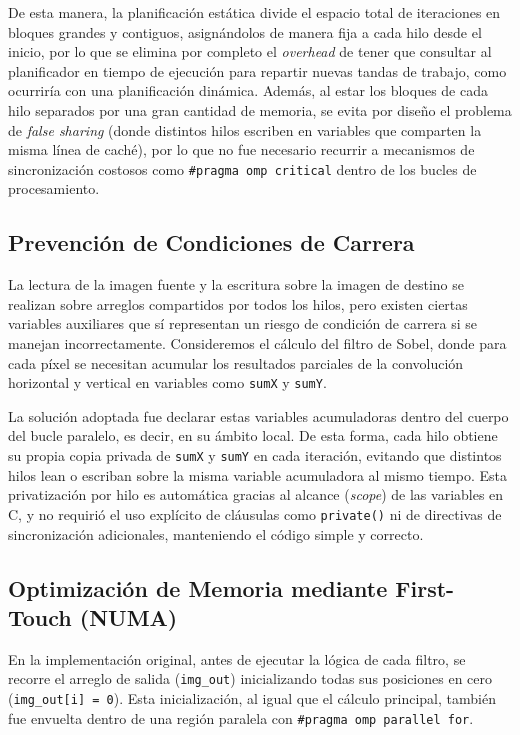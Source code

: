 De esta manera, la planificación estática divide el espacio total de iteraciones en bloques grandes y contiguos, asignándolos de manera fija a cada hilo desde el inicio, por lo que se elimina por completo el \textit{overhead} de tener que consultar al planificador en tiempo de ejecución para repartir nuevas tandas de trabajo, como ocurriría con una planificación dinámica. Además, al estar los bloques de cada hilo separados por una gran cantidad de memoria, se evita por diseño el problema de \textit{false sharing} (donde distintos hilos escriben en variables que comparten la misma línea de caché), por lo que no fue necesario recurrir a mecanismos de sincronización costosos como \texttt{\#pragma omp critical} dentro de los bucles de procesamiento.


\subsection{Prevención de Condiciones de Carrera}

La lectura de la imagen fuente y la escritura sobre la imagen de destino se realizan sobre arreglos compartidos por todos los hilos, pero existen ciertas variables auxiliares que sí representan un riesgo de condición de carrera si se manejan incorrectamente. Consideremos el cálculo del filtro de Sobel, donde para cada píxel se necesitan acumular los resultados parciales de la convolución horizontal y vertical en variables como \texttt{sumX} y \texttt{sumY}.

La solución adoptada fue declarar estas variables acumuladoras dentro del cuerpo del bucle paralelo, es decir, en su ámbito local. De esta forma, cada hilo obtiene su propia copia privada de \texttt{sumX} y \texttt{sumY} en cada iteración, evitando que distintos hilos lean o escriban sobre la misma variable acumuladora al mismo tiempo. Esta privatización por hilo es automática gracias al alcance (\textit{scope}) de las variables en C, y no requirió el uso explícito de cláusulas como \texttt{private()} ni de directivas de sincronización adicionales, manteniendo el código simple y correcto.


\subsection{Optimización de Memoria mediante First-Touch (NUMA)}

En la implementación original, antes de ejecutar la lógica de cada filtro, se recorre el arreglo de salida (\texttt{img\_out}) inicializando todas sus posiciones en cero (\texttt{img\_out[i] = 0}). Esta inicialización, al igual que el cálculo principal, también fue envuelta dentro de una región paralela con \texttt{\#pragma omp parallel for}.

